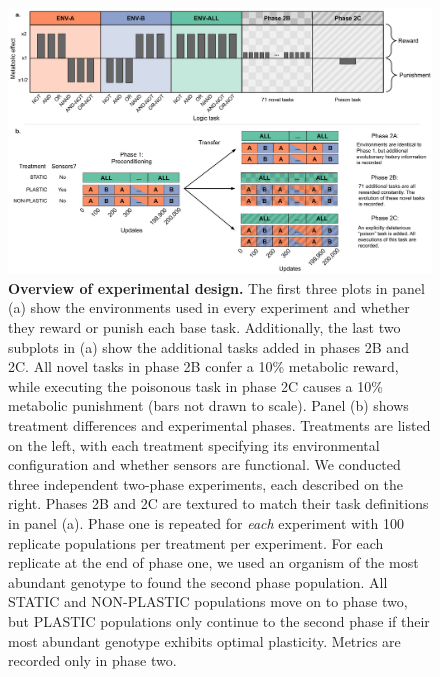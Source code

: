 \begin{figure}[h!]
    \centering
    \includegraphics[width=1\textwidth]{media-experimental-design.pdf}
    \caption{\small
    \textbf{Overview of experimental design.}
    The first three plots in panel (a) show the environments used in every experiment and whether they reward or punish each base task.
    Additionally, the last two subplots in (a) show the additional tasks added in phases 2B and 2C.
    All novel tasks in phase 2B confer a 10\% metabolic reward, while executing the poisonous task in phase 2C causes a 10\% metabolic punishment (bars not drawn to scale).
    Panel (b) shows treatment differences and experimental phases.
    Treatments are listed on the left, with each treatment specifying its environmental configuration and whether sensors are functional.
    We conducted three independent two-phase experiments, each described on the right.
    Phases 2B and 2C are textured to match their task definitions in panel (a).
    Phase one is repeated for \textit{each} experiment with 100 replicate populations per treatment per experiment.
    For each replicate at the end of phase one, we used an organism of the most abundant genotype to found the second phase population.
    All STATIC and NON-PLASTIC populations move on to phase two, but PLASTIC populations only continue to the second phase if their most abundant genotype exhibits optimal plasticity.
    Metrics are recorded only in phase two.
    }
    \label{fig:experimental-design}
\end{figure}